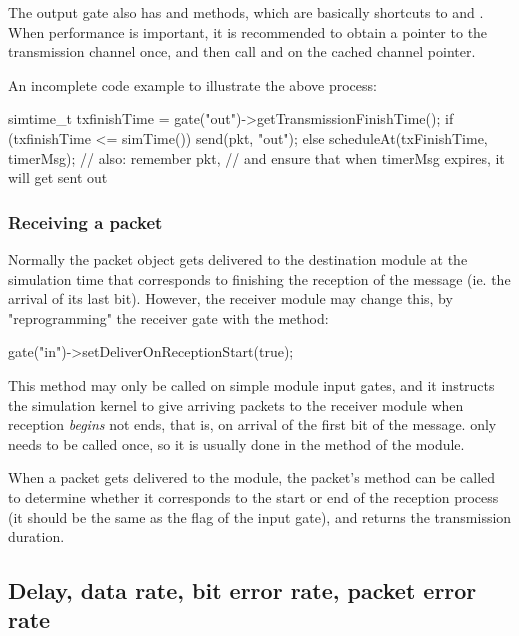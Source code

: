 The output gate also has  and 
methods, which are basically shortcuts to 
and . When performance
is important, it is recommended to obtain a pointer to the transmission
channel once, and then call  and 
on the cached channel pointer.

An incomplete code example to illustrate the above process:

\begin{cpp}
simtime_t txfinishTime = gate("out")->getTransmissionFinishTime();
if (txfinishTime <= simTime())
    send(pkt, "out");
else
    scheduleAt(txFinishTime, timerMsg); // also: remember pkt,
    // and ensure that when timerMsg expires, it will get sent out
\end{cpp}


\subsubsection{Receiving a packet}

Normally the packet object gets delivered to the destination module
at the simulation time that corresponds to finishing the reception
of the message (ie. the arrival of its last bit). However, the receiver
module may change this, by "reprogramming" the receiver gate with
the  method:

\begin{cpp}
gate("in")->setDeliverOnReceptionStart(true);
\end{cpp}

This method may only be called on simple module input gates, and it
instructs the simulation kernel to give arriving packets to the
receiver module when reception \textit{begins} not ends, that is,
on arrival of the first bit of the message.
 only needs to be called once,
so it is usually done in the  method of the module.

When a packet gets delivered to the module, the packet's
 method can be called to determine
whether it corresponds to the start or end of the reception
process (it should be the same as the 
flag of the input gate), and  returns the transmission
duration.


\subsection{Delay, data rate, bit error rate, packet error rate}

